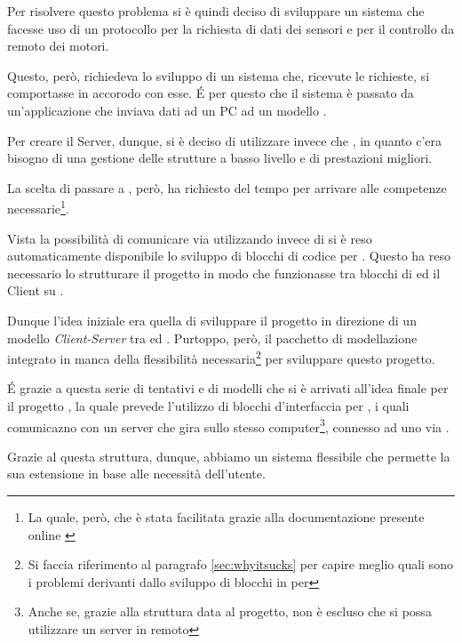 Per risolvere questo problema si è quindi deciso di sviluppare un sistema
che facesse uso di un protocollo per la richiesta di dati dei sensori e per
il controllo da remoto dei motori.

Questo, però, richiedeva lo sviluppo di un sistema che, ricevute le
richieste, si comportasse in accorodo con esse. \'E per questo che il
sistema è passato da un'applicazione che inviava dati ad un PC ad un
modello .

Per creare il Server, dunque, si è deciso di utilizzare  invece
che , in quanto c'era bisogno di una gestione delle
strutture a basso livello e di prestazioni migliori\cite{bib:progbench}.

La scelta di passare a , però, ha richiesto del tempo per
arrivare alle competenze necessarie\footnote{La quale, però, che è stata
facilitata grazie alla documentazione presente online
\cite{bib:blueZdocs}}.

Vista la possibilità di comunicare via  utilizzando
 invece di  si è reso automaticamente
disponibile lo sviluppo di blocchi di codice per .
Questo ha reso necessario lo strutturare il progetto in modo che
funzionasse tra blocchi di  ed il Client su \SPAM{}.

Dunque l'idea iniziale era quella di sviluppare il progetto in direzione di
un modello \emph{Client-Server} tra  ed .
Purtoppo, però, il pacchetto di modellazione  integrato in
 manca della flessibilità necessaria\footnote{Si faccia
riferimento al paragrafo \ref{sec:whyitsucks} per capire meglio quali sono
i problemi derivanti dallo sviluppo di blocchi in  per
} per sviluppare questo progetto.

\'E grazie a questa serie di tentativi e di modelli che si è arrivati
all'idea finale per il progetto \BROFist{}, la quale prevede l'utilizzo di
blocchi d'interfaccia per , i quali comunicazno con un
server che gira sullo stesso computer\footnote{Anche se, grazie alla
struttura data al progetto, non è escluso che si possa utilizzare un server
in remoto}, connesso ad uno \SPAM{} via .

Grazie al questa struttura, dunque, abbiamo un sistema flessibile che
permette la sua estensione in base alle necessità dell'utente.

